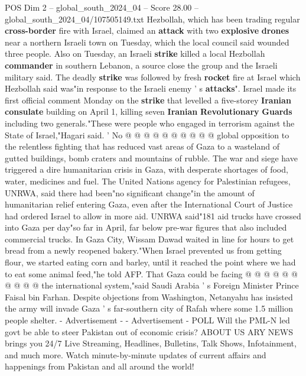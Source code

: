 \begin{textsample}{POS Dim 2 – global\_south\_2024\_04 – Score 28.00 – global\_south\_2024\_04/107505149.txt}
Hezbollah, which has been trading regular \textbf{cross-border} fire with Israel, claimed an \textbf{attack} with two \textbf{explosive} \textbf{drones} near a northern Israeli town on Tuesday, which the local council said wounded three people.
Also on Tuesday, an Israeli \textbf{strike} killed a local Hezbollah \textbf{commander} in southern Lebanon, a source close the group and the Israeli military said.
The deadly \textbf{strike} was followed by fresh \textbf{rocket} fire at Israel which Hezbollah said was"in response to the Israeli enemy ' s \textbf{attacks}".
Israel made its first official comment Monday on the \textbf{strike} that levelled a five-storey \textbf{Iranian} \textbf{consulate} building on April 1, killing seven \textbf{Iranian} \textbf{Revolutionary} \textbf{Guards} including two generals."These were people who engaged in terrorism against the State of Israel,"Hagari said. ' No @ @ @ @ @ @ @ @ @ @ global opposition to the relentless fighting that has reduced vast areas of Gaza to a wasteland of gutted buildings, bomb craters and mountains of rubble.
The war and siege have triggered a dire humanitarian crisis in Gaza, with desperate shortages of food, water, medicines and fuel.
The United Nations agency for Palestinian refugees, UNRWA, said there had been"no significant change"in the amount of humanitarian relief entering Gaza, even after the International Court of Justice had ordered Israel to allow in more aid.
UNRWA said"181 aid trucks have crossed into Gaza per day"so far in April, far below pre-war figures that also included commercial trucks.
In Gaza City, Wissam Dawad waited in line for hours to get bread from a newly reopened bakery."When Israel prevented us from getting flour, we started eating corn and barley, until it reached the point where we had to eat some animal feed,"he told AFP.
That Gaza could be facing @ @ @ @ @ @ @ @ @ @ the international system,"said Saudi Arabia ' s Foreign Minister Prince Faisal bin Farhan.
Despite objections from Washington, Netanyahu has insisted the army will invade Gaza ' s far-southern city of Rafah where some 1.5 million people shelter. - Advertisement - - Advertisement - POLL Will the PML-N led govt be able to steer Pakistan out of economic crisis?
ABOUT US ARY NEWS brings you 24/7 Live Streaming, Headlines, Bulletins, Talk Shows, Infotainment, and much more.
Watch minute-by-minute updates of current affairs and happenings from Pakistan and all around the world!

\end{textsample}
